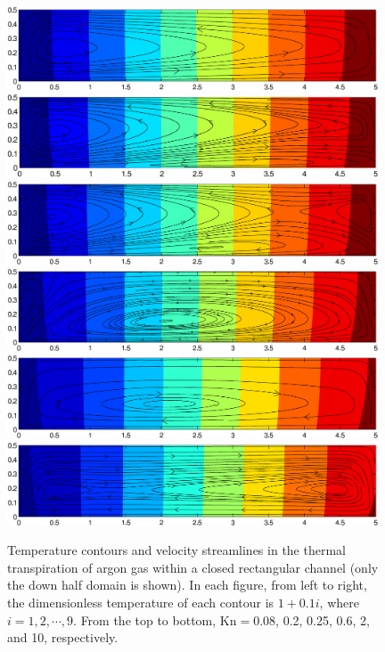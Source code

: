 \begin{figure}[p]
	\centering
	{\includegraphics[width=11cm]{Chapter4/IMG/Tc008.pdf}}\\
	{\includegraphics[width=11cm]{Chapter4/IMG/Tc02.pdf}}\\
	{\includegraphics[width=11cm]{Chapter4/IMG/Tc025.pdf}}\\
	{\includegraphics[width=11cm]{Chapter4/IMG/Tc06.pdf}}\\
	{\includegraphics[width=11cm]{Chapter4/IMG/Tc2.pdf}}\\
	{\includegraphics[width=11cm]{Chapter4/IMG/Tc10.pdf}}
	\caption{Temperature contours and velocity streamlines in the thermal transpiration of argon gas within a closed rectangular channel (only the down half domain is shown). In each figure, from left to right, the dimensionless temperature of each contour is $1+0.1i$, where $i=1,2,\cdots,9$. From the top to bottom, $\text{Kn}=0.08$, 0.2, 0.25, 0.6, 2, and 10, respectively. } 
	\label{thermal_creep_channel}
\end{figure}


